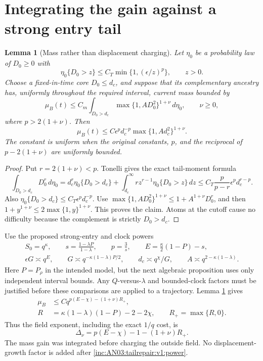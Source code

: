 \documentclass[11pt]{article}
\newtheorem{lemma}[theorem]{Lemma}\newtheorem{proposition}[theorem]{Proposition}
\theoremstyle{remark}\newtheorem{remark}[theorem]{Remark}
\newcommand{\dd}{\,d}\newcommand{\E}{\mathbb E}
\begin{document}
\section{Integrating the gain against a strong entry tail}
\begin{lemma}[Mass rather than displacement charging]
\label{inc:AN03:tailrepair:v1:moment}
Let $\eta_0$ be a probability law of $D_0\ge0$ with
\[
 \eta_0\{D_0>z\}\le C_T\min\{1,(\epsilon/z)^p\},\qquad z>0.
\]
Choose a fixed-in-time core $D_0\le d_c$, and suppose that its complementary ancestry has, uniformly throughout the required interval, current mass bounded by
\[
 \mu_B(t)\le C_m\int_{D_0>d_c}\max\{1,A D_0^2\}^{1+\nu}\dd\eta_0,
 \qquad \nu\ge0,
\]
where $p>2(1+\nu)$. Then
\begin{equation}\label{inc:AN03:tailrepair:v1:massbound}
 \mu_B(t)\le C\epsilon^p d_c^{-p}
          \max\{1,A d_c^2\}^{1+\nu}.
\end{equation}
The constant is uniform when the original constants, $p$, and the reciprocal of $p-2(1+\nu)$ are uniformly bounded.
\end{lemma}
\begin{proof}
Put $r=2(1+\nu)<p$. Tonelli gives the exact tail-moment formula
\[
 \int_{D_0>d_c}D_0^r\dd\eta_0
 =d_c^r\eta_0\{D_0>d_c\}
       +\int_{d_c}^{\infty}r z^{r-1}\eta_0\{D_0>z\}\dd z
 \le C_T\frac{p}{p-r}\epsilon^p d_c^{r-p}.
\]
Also $\eta_0\{D_0>d_c\}\le C_T\epsilon^p d_c^{-p}$. Use
$\max\{1,AD_0^2\}^{1+\nu}\le1+A^{1+\nu}D_0^r$, and then
$1+y^{1+\nu}\le2\max\{1,y\}^{1+\nu}$. This proves the claim. Atoms at the cutoff cause no difficulty because the complement is strictly $D_0>d_c$.
\end{proof}

Use the proposed strong-entry and clock powers
\begin{gather*}
 S_0=q^\kappa,\qquad s=\frac{1-\lambda P}{1-\lambda},\qquad
 p=\frac3s,\qquad E=\frac\kappa2(1-P)-s,\\
 \epsilon G\asymp q^E,\qquad
 G\asymp q^{-\kappa(1-\lambda)P/2},\qquad
 d_c\asymp q^\chi/G,\qquad
 A\asymp q^{2-\kappa(1-\lambda)}.
\end{gather*}
Here $P=P_\rho$ in the intended model, but the next algebraic proposition uses only independent interval bounds. Any $Q$-versus-$\lambda$ and bounded-clock factors must be justified before these comparisons are applied to a trajectory. Lemma \ref{inc:AN03:tailrepair:v1:moment} gives
\begin{align}
 \mu_B&\le Cq^{p(E-\chi)-(1+\nu)R_+},\label{inc:AN03:tailrepair:v1:power}\\
 R&=\kappa(1-\lambda)(1-P)-2-2\chi,
 \qquad R_+=\max\{R,0\}.\nonumber
\end{align}
Thus the field exponent, including the exact $1/q$ cost, is
\begin{equation}\label{inc:AN03:tailrepair:v1:delta}
 \Delta_\nu=p(E-\chi)-1-(1+\nu)R_+.
\end{equation}
The mass gain was integrated before charging the outside field. No displacement-growth factor is added after \eqref{inc:AN03:tailrepair:v1:power}.
\end{document}
